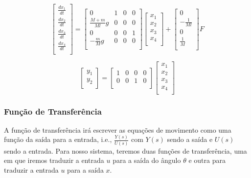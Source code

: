 \documentclass[a4paper, 12pt]{article}
\begin{document}
\begin{equation}\label{eq:movi_12}
\begin{bmatrix}
\frac{dx_{1}}{dt}\\
\frac{dx_{2}}{dt}\\
\frac{dx_{3}}{dt}\\
\frac{dx_{4}}{dt}\\
\end{bmatrix}
=
\begin{bmatrix}
0 & 1 & 0 & 0\\
\frac{M + m}{Ml}g & 0 & 0 & 0\\
0 & 0 & 0 & 1\\
-\frac{m}{M}g & 0 & 0 & 0\\
\end{bmatrix}
\begin{bmatrix}
x_{1} \\
x_{2} \\
x_{3}\\
x_{4} \\
\end{bmatrix}
+
\begin{bmatrix}
0 \\
-\frac{1}{Ml} \\
0\\
\frac{1}{M} \\
\end{bmatrix}
F
\end{equation}

\begin{equation}\label{eq:movi_12}
\begin{bmatrix}
y_{1}\\
y_{2}\\
\end{bmatrix}
=
\begin{bmatrix}
1 & 0 & 0 & 0\\
0 & 0 & 1 & 0\\
\end{bmatrix}
\begin{bmatrix}
x_{1} \\
x_{2} \\
x_{3}\\
x_{4} \\
\end{bmatrix}
\end{equation}

\subsubsection{Função de Transferência}
A função de transferência irá escrever as equações de movimento como uma função da saída para a entrada, i.e., $\frac{Y(s)}{U(s)}$ com $Y(s)$ sendo a saída e $U(s)$ sendo a entrada. Para nosso sistema, teremos duas funções de transferência, uma em que iremos traduzir a entrada $u$ para a saída do ângulo $\theta$ e outra para traduzir a entrada $u$ para a saída $x$.
\end{document}
